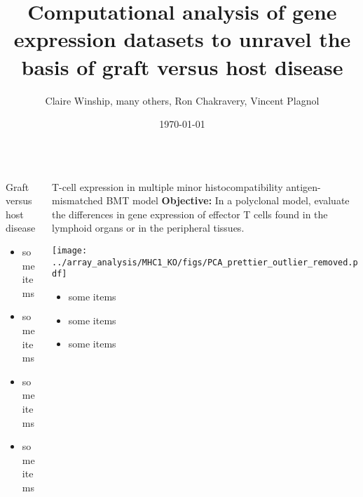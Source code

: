 \documentclass[final,hyperref={pdfpagelabels=false}]{beamer}
\title[GVHD]{Computational analysis of gene expression datasets to unravel the basis of graft versus host disease}
\author[Winship \& Plagnol]{Claire Winship, many others, Ron Chakravery, Vincent Plagnol}
\institute[UGI]{UCL Genetics Institute}
\date{\today}
\begin{document}
  \begin{frame}{} 

  \begin{beamercolorbox}{}
    \maketitle
  \end{beamercolorbox}


    \vfill
    \begin{columns}[t]

      \begin{column}{.25\linewidth}
        \begin{block}{Graft versus host disease}
          \begin{itemize}
          \item some items
          \item some items
          \item some items
          \item some items
          \end{itemize}
        \end{block}
      \end{column}


      \begin{column}{.24\linewidth}
        \begin{block}{T-cell expression in multiple minor histocompatibility antigen-mismatched BMT model}
	  {\bf Objective:} In a polyclonal model, evaluate the differences in gene expression of effector T cells found in the lymphoid organs or in the peripheral tissues.
	  \begin{center}
	    \texttt{[image: ../array\_analysis/MHC1\_KO/figs/PCA\_prettier\_outlier\_removed.pdf]}
	    \end{center}
          \begin{itemize}
          \item some items
          \item some items
          \item some items
          \end{itemize}
        \end{block}
      \end{column}




\end{columns}
\end{frame}
\end{document}
